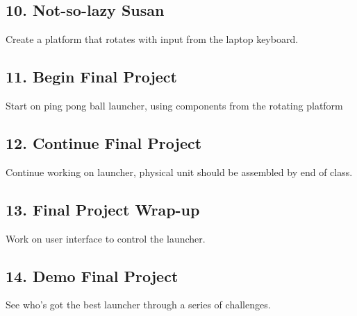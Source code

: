 \documentclass[12pt,letterpaper]{report}
\begin{document}
\subsection*{10. Not-so-lazy Susan}
Create a platform that rotates with input from the laptop keyboard.
\subsection*{11. Begin Final Project}
Start on ping pong ball launcher, using components from the rotating platform
\subsection*{12. Continue Final Project}
Continue working on launcher, physical unit should be assembled by end of class.
\subsection*{13. Final Project Wrap-up}
Work on user interface to control the launcher.
\subsection*{14. Demo Final Project}
See who's got the best launcher through a series of challenges.
\end{document}
